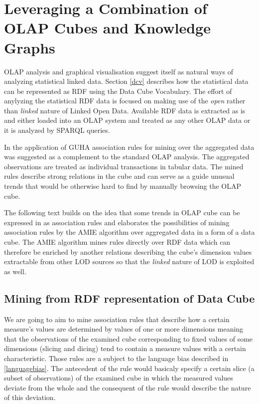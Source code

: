 \chapter{Leveraging a Combination of OLAP Cubes and Knowledge Graphs\label{combining}}

OLAP analysis and graphical visualisation suggest itself as natural ways of analyzing statistical linked data. Section \ref{dcv} describes how the statistical data can be represented as RDF using the Data Cube Vocabulary. The effort of anylyzing the statistical RDF data is focused on making use of the \textit{open} rather than \textit{linked} nature of Linked Open Data. Available RDF data is extracted as is and either loaded into an OLAP system  and treated as any other OLAP data \cite{Kämpgen2011} or it is analyzed by SPARQL queries.\cite{Capadisli2013} 

In \cite{Chudan2015} the application of GUHA \cite{Rauch2017} association rules for mining over the aggregated data was suggested as a complement to the standard OLAP analysis. The aggregated observations are treated as individual transactions in tabular data. The mined rules describe strong relations in the cube and can serve as a guide unusual trends that would be otherwise hard to find by manually browsing the OLAP cube.

The following text builds on the idea that some trends in OLAP cube can be expressed in as association rules and elaborates the possibilities of mining association rules by the AMIE algorithm over aggregated data in a form of a data cube. The AMIE algorithm mines rules directly over RDF data which can therefore be enriched by another relations describing the cube's dimension values extractable from other LOD sources so that the \textit{linked} nature of LOD is exploited as well.

\section{Mining from RDF representation of Data Cube}

We are going to aim to mine association rules that describe how a certain measure's values are determined by values of one or more dimensions meaning that the observations of the examined cube corresponding to fixed values of some dimensions (slicing and dicing) tend to contain a measure values with a certain characteristic. Those rules are a subject to the language bias described in \ref{languagebias}. The antecedent of the rule would basicaly specify a certain slice (a subset of observations) of the examined cube in which the measured values deviate from the whole and the consequent of the rule would describe the nature of this deviation.

